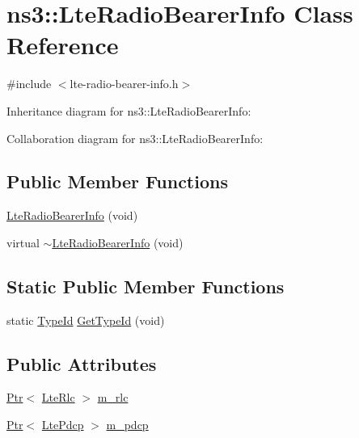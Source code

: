 \hypertarget{classns3_1_1LteRadioBearerInfo}{}\section{ns3\+:\+:Lte\+Radio\+Bearer\+Info Class Reference}
\label{classns3_1_1LteRadioBearerInfo}


{\ttfamily \#include $<$lte-\/radio-\/bearer-\/info.\+h$>$}



Inheritance diagram for ns3\+:\+:Lte\+Radio\+Bearer\+Info\+:


Collaboration diagram for ns3\+:\+:Lte\+Radio\+Bearer\+Info\+:
\subsection*{Public Member Functions}
\begin{DoxyCompactItemize}
\item 
\hyperlink{classns3_1_1LteRadioBearerInfo_af7d2d8620b6ca7aad9e9d24ae2890621}{Lte\+Radio\+Bearer\+Info} (void)
\item 
virtual \hyperlink{classns3_1_1LteRadioBearerInfo_a2e7a580f3cc582ff533c8975373c22fa}{$\sim$\+Lte\+Radio\+Bearer\+Info} (void)
\end{DoxyCompactItemize}
\subsection*{Static Public Member Functions}
\begin{DoxyCompactItemize}
\item 
static \hyperlink{classns3_1_1TypeId}{Type\+Id} \hyperlink{classns3_1_1LteRadioBearerInfo_a918a60035788d2ba5aa3f8a9b8f01b30}{Get\+Type\+Id} (void)
\end{DoxyCompactItemize}
\subsection*{Public Attributes}
\begin{DoxyCompactItemize}
\item 
\hyperlink{classns3_1_1Ptr}{Ptr}$<$ \hyperlink{classns3_1_1LteRlc}{Lte\+Rlc} $>$ \hyperlink{classns3_1_1LteRadioBearerInfo_a352622b4fc23346ebfbfc72a0c118eab}{m\+\_\+rlc}
\item 
\hyperlink{classns3_1_1Ptr}{Ptr}$<$ \hyperlink{classns3_1_1LtePdcp}{Lte\+Pdcp} $>$ \hyperlink{classns3_1_1LteRadioBearerInfo_a41199c2413750dd1c29b8b4d362633df}{m\+\_\+pdcp}
\end{DoxyCompactItemize}
